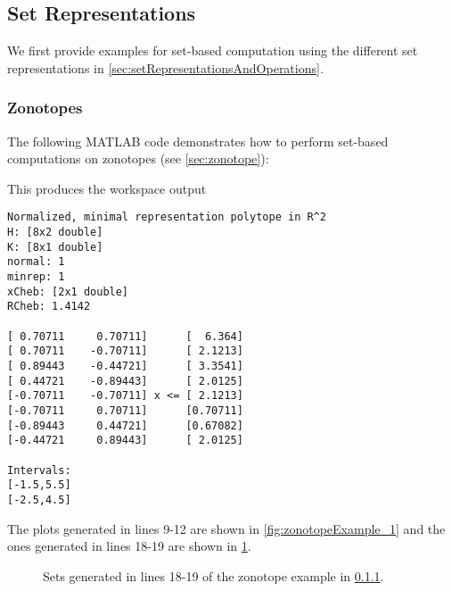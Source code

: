 \subsection{Set Representations}

We first provide examples for set-based computation using the different set representations in \cref{sec:setRepresentationsAndOperations}.


\subsubsection{Zonotopes} \label{sec:zonotopeExample}

The following MATLAB code demonstrates how to perform set-based computations on zonotopes (see \cref{sec:zonotope}):

{\small
	}

This produces the workspace output
\begin{verbatim}
Normalized, minimal representation polytope in R^2
H: [8x2 double]
K: [8x1 double]
normal: 1
minrep: 1
xCheb: [2x1 double]
RCheb: 1.4142

[ 0.70711     0.70711]      [  6.364]
[ 0.70711    -0.70711]      [ 2.1213]
[ 0.89443    -0.44721]      [ 3.3541]
[ 0.44721    -0.89443]      [ 2.0125]
[-0.70711    -0.70711] x <= [ 2.1213]
[-0.70711     0.70711]      [0.70711]
[-0.89443     0.44721]      [0.67082]
[-0.44721     0.89443]      [ 2.0125]

Intervals: 
[-1.5,5.5]
[-2.5,4.5]
\end{verbatim}

The plots generated in lines 9-12 are shown in \cref{fig:zonotopeExample_1} and the ones generated in lines 18-19 are shown in \cref{fig:zonotopeExample_2}.

\begin{figure}[h!tb]
	\begin{minipage}{0.45\columnwidth}
		\centering
		\caption{Zonotopes generated in lines 9-12 of the zonotope example in \cref{sec:zonotopeExample}.}
		\label{fig:zonotopeExample_1}
	\end{minipage}
	\hspace{0.08\columnwidth}
	\begin{minipage}{0.45\columnwidth}
		\centering
		\caption{Sets generated in lines 18-19 of the zonotope example in \cref{sec:zonotopeExample}.}
		\label{fig:zonotopeExample_2}
	\end{minipage}
\end{figure}









